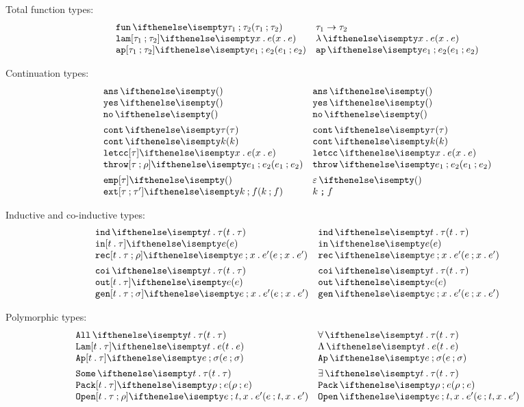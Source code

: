 \documentclass[11pt,twoside]{article}
\begin{document}
\noindent Total function types:
\begin{displaymath}
  \begin{array}{l@{\quad}l@{\quad}l}
    \arrTy{\tau_1}{\tau_2} & \arrTy*{\tau_1}{\tau_2} \\
    \lamEx{x}{e} & \lamEx*{x}{e} \\
    \appEx{e_1}{e_2} & \appEx*{e_1}{e_2}
  \end{array}
\end{displaymath}

\noindent Continuation types:
\begin{displaymath}
  \begin{array}{l@{\quad}l@{\quad}l}
    \ansTy & \ansTy* \\
    \yesEx & \yesEx* \\
    \noEx & \noEx* \\[1ex]

    \contTy{\tau}     & \contTy*{\tau} \\
    \contEx{k}        & \contEx*{k} \\
    \letccEx[\tau]{x}{e} & \letccEx*{x}{e} \\
    \throwEx[\tau][\rho]{e_1}{e_2} & \throwEx*{e_1}{e_2} \\[1ex]

    \empStk[\tau]     & \empStk*[\tau] \\
    \extStk{k}{f}     & \extStk*{k}{f} 
  \end{array}
\end{displaymath}

\noindent Inductive and co-inductive types:
\begin{displaymath}
  \begin{array}{l@{\quad}l@{\quad}l}
    \indTy{t}{\tau} & \indTy*{t}{\tau} \\
    \inEx[t][\tau]{e} & \inEx*{e} \\
    \recEx[t][\tau][\rho]{e}{x}{e'} & \recEx*{e}{x}{e'} \\[1ex]
    \coiTy{t}{\tau} & \coiTy*{t}{\tau} \\
    \outEx[t][\tau]{e} & \outEx*{e} \\
    \genEx[t][\tau][\sigma]{e}{x}{e'} & \genEx*{e}{x}{e'}
  \end{array}
\end{displaymath}

\noindent Polymorphic types:
\begin{displaymath}
  \begin{array}{l@{\quad}l@{\quad}l}
    \AllTy{t}{\tau} & \AllTy*{t}{\tau} \\
    \LamEx{t}[\tau]{e} & \LamEx*{t}{e} \\
    \AppEx[t][\tau]{e}{\sigma} & \AppEx*{e}{\sigma}\\[1ex]
    \SomeTy{t}{\tau}  & \SomeTy*{t}{\tau} \\
    \PackEx[t][\tau]{\rho}{e} & \PackEx*{\rho}{e} \\
    \OpenEx[t][\tau]{e}[\rho]{x}{e'} & \OpenEx*[t][\tau]{e}[\rho]{x}{e'}
  \end{array}
\end{displaymath}
\end{document}
